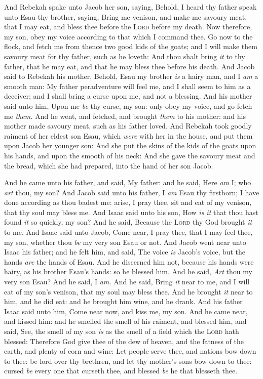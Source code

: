 \documentclass[11pt,letterpaper,oneside]{memoir}
\begin{document}
And Rebekah spake unto Jacob her son, saying, Behold, I heard thy father
speak unto Esau thy brother, saying, Bring me venison, and make me
savoury meat, that I may eat, and bless thee before the \textsc{Lord}
before my death. Now therefore, my son, obey my voice according to that
which I command thee. Go now to the flock, and fetch me from thence two
good kids of the goats; and I will make them savoury meat for thy
father, such as he loveth: And thou shalt bring \emph{it} to thy father,
that he may eat, and that he may bless thee before his death. And Jacob
said to Rebekah his mother, Behold, Esau my brother \emph{is} a hairy
man, and I \emph{am} a smooth man: My father peradventure will feel me,
and I shall seem to him as a deceiver; and I shall bring a curse upon
me, and not a blessing. And his mother said unto him, Upon me \emph{be}
thy curse, my son: only obey my voice, and go fetch me \emph{them. }And
he went, and fetched, and brought \emph{them} to his mother: and his
mother made savoury meat, such as his father loved. And Rebekah took
goodly raiment of her eldest son Esau, which \emph{were} with her in the
house, and put them upon Jacob her younger son: And she put the skins of
the kids of the goats upon his hands, and upon the smooth of his neck:
And she gave the savoury meat and the bread, which she had prepared,
into the hand of her son Jacob.

And he came unto his father, and said, My father: and he said, Here
\emph{am} I; who \emph{art} thou, my son? And Jacob said unto his
father, I \emph{am} Esau thy firstborn; I have done according as thou
badest me: arise, I pray thee, sit and eat of my venison, that thy soul
may bless me. And Isaac said unto his son, How \emph{is it} that thou
hast found \emph{it} so quickly, my son? And he said, Because the
\textsc{Lord} thy God brought \emph{it} to me. And Isaac said unto Jacob,
Come near, I pray thee, that I may feel thee, my son, whether thou
\emph{be} my very son Esau or not. And Jacob went near unto Isaac his
father; and he felt him, and said, The voice \emph{is} Jacob's voice,
but the hands \emph{are} the hands of Esau. And he discerned him not,
because his hands were hairy, as his brother Esau's hands: so he blessed
him. And he said, \emph{Art} thou my very son Esau? And he said, I
\emph{am. }And he said, Bring \emph{it} near to me, and I will eat of my
son's venison, that my soul may bless thee. And he brought \emph{it}
near to him, and he did eat: and he brought him wine, and he drank. And
his father Isaac said unto him, Come near now, and kiss me, my son. And
he came near, and kissed him: and he smelled the smell of his raiment,
and blessed him, and said, See, the smell of my son \emph{is} as the
smell of a field which the \textsc{Lord} hath blessed: Therefore God give
thee of the dew of heaven, and the fatness of the earth, and plenty of
corn and wine: Let people serve thee, and nations bow down to thee: be
lord over thy brethren, and let thy mother's sons bow down to thee:
cursed \emph{be} every one that curseth thee, and blessed \emph{be} he
that blesseth thee.
\end{document}
